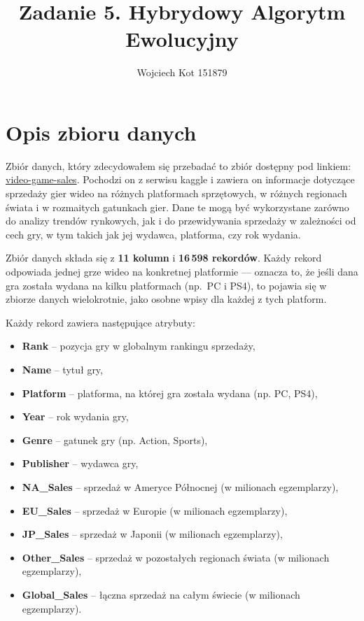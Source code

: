 \documentclass[11pt]{article}
\title{Zadanie 5. Hybrydowy Algorytm Ewolucyjny}
\author{Wojciech Kot 151879}
\date{}
\begin{document}
\maketitle
\newpage

\section{Opis zbioru danych}\label{sec:opis-zbioru-danych}

Zbiór danych, który zdecydowałem się przebadać to zbiór dostępny pod linkiem:
\href{https://www.kaggle.com/datasets/anandshaw2001/video-game-sales}{video-game-sales}.
Pochodzi on z serwisu kaggle i zawiera on informacje dotyczące sprzedaży gier wideo na różnych platformach sprzętowych,
w różnych regionach świata i w rozmaitych gatunkach gier.
Dane te mogą być wykorzystane zarówno do analizy trendów rynkowych,
jak i do przewidywania sprzedaży w zależności od cech gry, w tym takich jak jej wydawca, platforma, czy rok wydania.

Zbiór danych składa się z \textbf{11 kolumn} i \textbf{16\,598 rekordów}.
Każdy rekord odpowiada jednej grze wideo na konkretnej platformie — oznacza to,
że jeśli dana gra została wydana na kilku platformach (np.\ PC i PS4),
to pojawia się w zbiorze danych wielokrotnie, jako osobne wpisy dla każdej z tych platform.

Każdy rekord zawiera następujące atrybuty:
\begin{itemize}
  \item \textbf{Rank} – pozycja gry w globalnym rankingu sprzedaży,
  \item \textbf{Name} – tytuł gry,
  \item \textbf{Platform} – platforma, na której gra została wydana (np. PC, PS4),
  \item \textbf{Year} – rok wydania gry,
  \item \textbf{Genre} – gatunek gry (np. Action, Sports),
  \item \textbf{Publisher} – wydawca gry,
  \item \textbf{NA\_Sales} – sprzedaż w Ameryce Północnej (w milionach egzemplarzy),
  \item \textbf{EU\_Sales} – sprzedaż w Europie (w milionach egzemplarzy),
  \item \textbf{JP\_Sales} – sprzedaż w Japonii (w milionach egzemplarzy),
  \item \textbf{Other\_Sales} – sprzedaż w pozostałych regionach świata (w milionach egzemplarzy),
  \item \textbf{Global\_Sales} – łączna sprzedaż na całym świecie (w milionach egzemplarzy).
\end{itemize}
\end{document}
